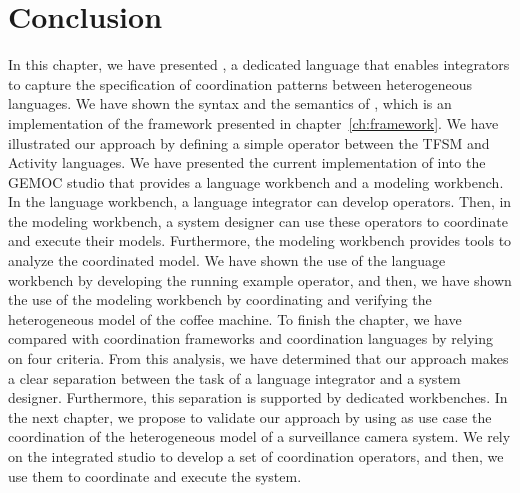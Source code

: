 \section{Conclusion}
In this chapter, we have presented \bcool, a dedicated language that enables integrators to capture the specification of coordination patterns between heterogeneous languages. We have shown the syntax and the semantics of \bcool, which is an implementation of the framework presented in chapter~\ref{ch:framework}. We have illustrated our approach by defining a simple operator between the TFSM and Activity languages. We have presented the current implementation of \bcool into the GEMOC studio that provides a language workbench and a modeling workbench. In the language workbench, a language integrator can develop \bcool operators. Then, in the modeling workbench, a system designer can use these operators to coordinate and execute their models. Furthermore, the modeling workbench provides tools to analyze the coordinated model. We have shown the use of the language workbench by developing the running example operator, and then, we have shown the use of the modeling workbench by coordinating and verifying the heterogeneous model of the coffee machine. To finish the chapter, we have compared \bcool with coordination frameworks and coordination languages by relying on four criteria. From this analysis, we have determined that our approach makes a clear separation between the task of a language integrator and a system designer. Furthermore, this separation is supported by dedicated workbenches. In the next chapter, we propose to validate our approach by using as use case the coordination of the heterogeneous model of a surveillance camera system. We rely on the integrated studio to develop a set of coordination operators, and then, we use them to coordinate and execute the system. 


